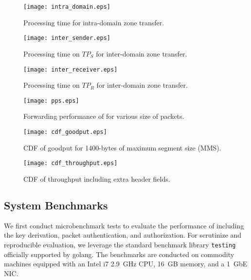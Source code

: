  \begin{figure*}[h]
 	\begin{minipage}{.32\linewidth}
 		\centering
 		\texttt{[image: intra\_domain.eps]}
 		\caption{Processing time for intra-domain zone transfer.}
 		\label{fig:intra}
 	\end{minipage}\hspace*{1em}
 	\begin{minipage}{.32\linewidth}
 		\centering
 		\texttt{[image: inter\_sender.eps]}
 		\caption{Processing time on $TP_S$ for inter-domain zone transfer.}
 		\label{fig:inter_sender}
 	\end{minipage}\hspace*{1em}
 	\begin{minipage}{.32\linewidth}
 		\centering
 		\texttt{[image: inter\_receiver.eps]}
 		\caption{Processing time on $TP_R$ for inter-domain zone transfer.}
 		\label{fig:inter_receiver}
 	\end{minipage}
 \end{figure*}

\begin{figure*}[!htb]
	\begin{minipage}{.32\linewidth}
		\centering
		\texttt{[image: pps.eps]}
		\caption{Forwarding performance of \tp for various size of packets.}
		\label{fig:forwarding}
	\end{minipage}\hspace*{1em}
	\begin{minipage}{.32\linewidth}
		\centering
		\texttt{[image: cdf\_goodput.eps]}
		\caption{CDF of goodput for 1400-bytes of maximum segment size (MMS).}
		\label{fig:goodput}
	\end{minipage}\hspace*{1em}
	\begin{minipage}{.32\linewidth}
		\centering
		\texttt{[image: cdf\_throughput.eps]}
		\caption{CDF of throughput including extra header fields.}
		\label{fig:throughput}
	\end{minipage}
\end{figure*}

\subsection{System Benchmarks}
\label{ssec:systembenchmark}

We first conduct microbenchmark tests to evaluate the performance of \tp including the key
derivation, packet authentication, and authorization. For scrutinize and reproducible evaluation, 
we leverage the standard benchmark library \texttt{testing} officially supported by golang. 
The benchmarks are conducted on commodity machines equipped with an Intel i7 \SI{2.9}{GHz} 
CPU, \SI{16}{GB} memory, and a \SI{1}{GbE} NIC.

